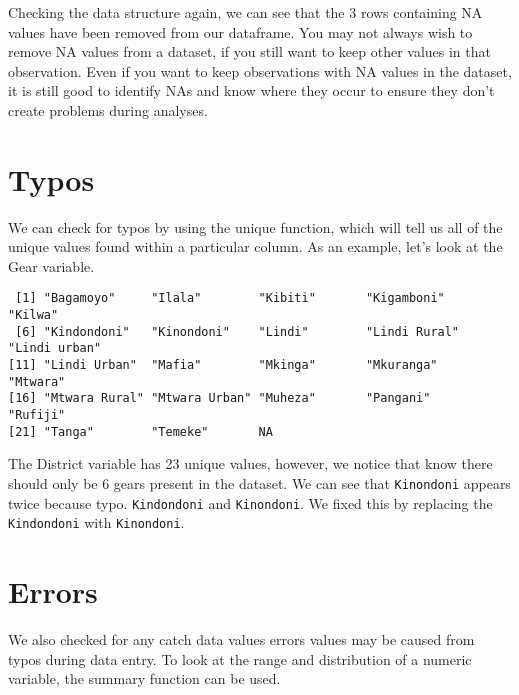\documentclass[
  12pt,
  a4paper,
  oneside]{book}
\newenvironment{Shaded}{\begin{snugshade}}{\end{snugshade}}
\newcommand{\KeywordTok}[1]{\textcolor[rgb]{0.13,0.29,0.53}{\textbf{#1}}}
\newcommand{\NormalTok}[1]{#1}
\newcommand{\OperatorTok}[1]{\textcolor[rgb]{0.81,0.36,0.00}{\textbf{#1}}}
\newcommand{\StringTok}[1]{\textcolor[rgb]{0.31,0.60,0.02}{#1}}
\begin{document}
\begin{Shaded}
\end{Shaded}

Checking the data structure again, we can see that the 3 rows containing NA values have been removed from our dataframe. You may not always wish to remove NA values from a dataset, if you still want to keep other values in that observation. Even if you want to keep observations with NA values in the dataset, it is still good to identify NAs and know where they occur to ensure they don't create problems during analyses.

\hypertarget{typos}{%
\section{Typos}\label{typos}}

We can check for typos by using the unique function, which will tell us all of the unique values found within a particular column. As an example, let's look at the Gear variable.

\begin{verbatim}
 [1] "Bagamoyo"     "Ilala"        "Kibiti"       "Kigamboni"    "Kilwa"       
 [6] "Kindondoni"   "Kinondoni"    "Lindi"        "Lindi Rural"  "Lindi urban" 
[11] "Lindi Urban"  "Mafia"        "Mkinga"       "Mkuranga"     "Mtwara"      
[16] "Mtwara Rural" "Mtwara Urban" "Muheza"       "Pangani"      "Rufiji"      
[21] "Tanga"        "Temeke"       NA            
\end{verbatim}

The District variable has 23 unique values, however, we notice that know there should only be 6 gears present in the dataset. We can see that \texttt{Kinondoni} appears twice because typo. \texttt{Kindondoni} and \texttt{Kinondoni}. We fixed this by replacing the \texttt{Kindondoni} with \texttt{Kinondoni}.

\hypertarget{errors}{%
\section{Errors}\label{errors}}

We also checked for any catch data values errors values may be caused from typos during data entry. To look at the range and distribution of a numeric variable, the summary function can be used.
\end{document}
